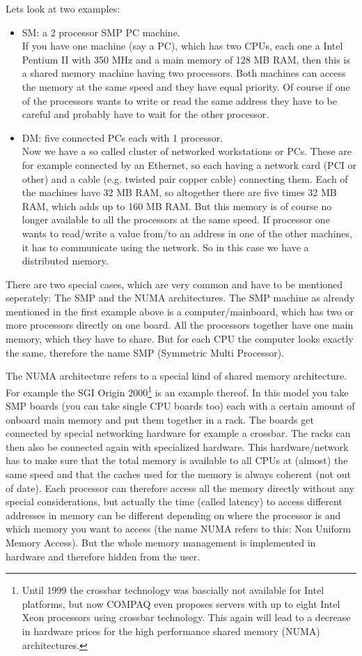 Lets look at two examples:  
\begin{itemize}
\item SM: a 2 processor SMP PC machine.\\
If you have one machine (say a PC), which has two CPUs, each one a
Intel Pentium II with 350 MHz and a main memory of 128 MB RAM, then
this is a shared memory machine having two processors. Both machines
can access the memory at the same speed and they have equal priority.
Of course if one of the processors wants to write or read the same
address they have to be careful and probably have to wait for the other
processor.
\item DM: five connected PCs each with 1 processor.\\
Now we have a so called cluster of networked workstations or PCs.
These are for example connected by an Ethernet, so each having a 
network card (PCI or other) and a cable (e.g. twisted pair copper cable)
connecting them. Each of the machines have 32 MB RAM, so altogether
there are five times 32 MB RAM, which adds up to 160 MB RAM. But this
memory is of course no longer available to all the processors at the
same speed. If processor one wants to read/write a value from/to an address
in one of the other machines, it has to communicate using the network.
So in this case we have a distributed memory.
\end{itemize}

There are two special cases, which are very common and have to be mentioned
seperately: The SMP and the NUMA architectures. The SMP machine as 
already mentioned in the first example above is a computer/mainboard,
which has two or more processors directly on one board. All the processors 
together have one main memory, which they have to share. But for each
CPU the computer looks exactly the same, therefore the name SMP 
(Symmetric Multi Processor).

The NUMA architecture refers to a special kind of shared memory architecture.
For example the SGI Origin 2000\footnote{Until 1999 the crossbar technology was 
bascially not available for Intel platforms, but now COMPAQ even proposes
servers with up to eight Intel Xeon processors using crossbar technology. This
again will lead to a decrease in hardware prices for the high performance
shared memory (NUMA) architectures.} 
is an example thereof. In this model
you take SMP boards (you can take single CPU boards too) each with
a certain amount of onboard main memory and 
put them together in a rack. The boards get connected by special
networking hardware for example a crossbar. The racks can then
also be connected again with specialized hardware. This hardware/network
has to make sure that the total memory is available to all CPUs at
(almost) the same speed and that the caches used for the memory
is always coherent (not out of date). Each processor can therefore
access all the memory directly without any special considerations, but
actually the time (called latency) to access different addresses in
memory can be different depending on where the processor is and
which memory you want to access (the name NUMA refers to this: Non Uniform 
Memory Access). But the whole memory management is
implemented in hardware and therefore hidden from the user.


